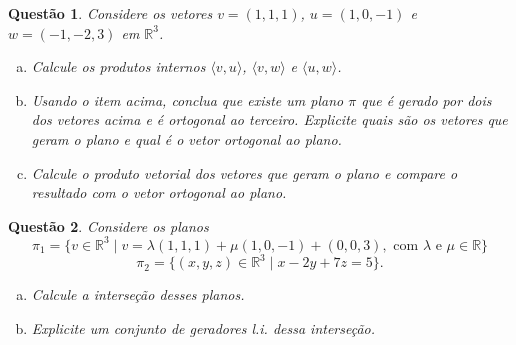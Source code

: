 \documentclass[a4paper,12pt]{article}
\def\R{\mathbb R}
\newcommand{\pint}[2]{\langle #1,#2\rangle}
\newtheorem{qst}{Questão}
\begin{document}
\begin{qst}
	Considere os vetores $v=(1,1,1)$, $u=(1,0,-1)$ e $w=(-1,-2,3)$ em $\R^3$.
	\begin{enumerate}[a)]
		\item Calcule os produtos internos $\pint{v}{u}$, $\pint v w$ e $\pint u w$.
		\item Usando o item acima, conclua que existe um plano $\pi$ que é gerado por dois dos vetores acima e é ortogonal ao terceiro. Explicite quais são os vetores que geram o plano e qual é o vetor ortogonal ao plano.
		\item Calcule o produto vetorial dos vetores que geram o plano e compare o resultado com o vetor ortogonal ao plano.
	\end{enumerate}
\end{qst}
\begin{qst}
Considere os planos $$\pi_1=\{v\in \R^3\mid v=\lambda(1,1,1)+\mu(1,0,-1)+(0,0,3),\mbox{ com }\lambda\mbox{ e }\mu\in \R\}$$ $$\pi_2=\{(x,y,z)\in\R^3\mid x-2y+7z=5\}.$$
\begin{enumerate}[a)]
	\item Calcule a interseção desses planos.
	\item Explicite um conjunto de geradores l.i. dessa interseção.
\end{enumerate}
\end{qst}
\end{document}
